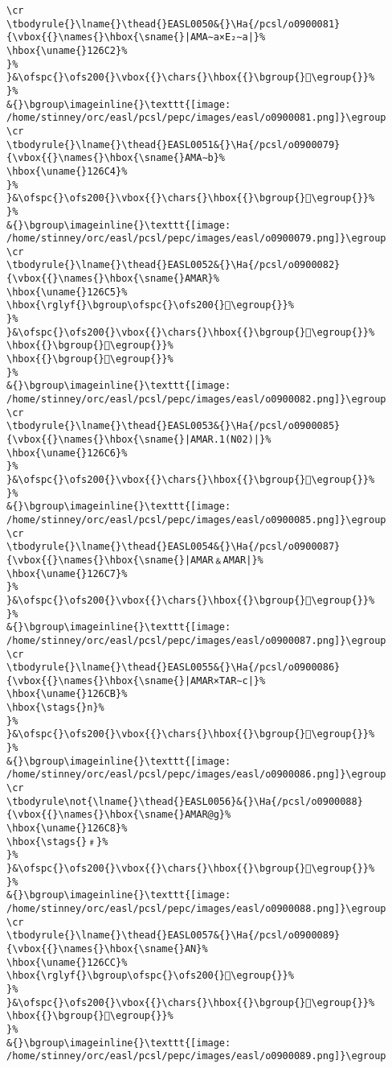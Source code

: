 \begin{verbatim}
\cr
\tbodyrule{}\lname{}\thead{}EASL0050&{}\Ha{/pcsl/o0900081}{\vbox{{}\names{}\hbox{\sname{}|AMA∼a×E₂∼a|}%
\hbox{\uname{}126C2}%
}%
}&\ofspc{}\ofs200{}\vbox{{}\chars{}\hbox{{}\bgroup{}𒛂\egroup{}}%
}%
&{}\bgroup\imageinline{}\texttt{[image: /home/stinney/orc/easl/pcsl/pepc/images/easl/o0900081.png]}\egroup
\cr
\tbodyrule{}\lname{}\thead{}EASL0051&{}\Ha{/pcsl/o0900079}{\vbox{{}\names{}\hbox{\sname{}AMA∼b}%
\hbox{\uname{}126C4}%
}%
}&\ofspc{}\ofs200{}\vbox{{}\chars{}\hbox{{}\bgroup{}𒛄\egroup{}}%
}%
&{}\bgroup\imageinline{}\texttt{[image: /home/stinney/orc/easl/pcsl/pepc/images/easl/o0900079.png]}\egroup
\cr
\tbodyrule{}\lname{}\thead{}EASL0052&{}\Ha{/pcsl/o0900082}{\vbox{{}\names{}\hbox{\sname{}AMAR}%
\hbox{\uname{}126C5}%
\hbox{\rglyf{}\bgroup\ofspc{}\ofs200{}𒛅\egroup{}}%
}%
}&\ofspc{}\ofs200{}\vbox{{}\chars{}\hbox{{}\bgroup{}𒛊\egroup{}}%
\hbox{{}\bgroup{}𒛅\egroup{}}%
\hbox{{}\bgroup{}𒛉\egroup{}}%
}%
&{}\bgroup\imageinline{}\texttt{[image: /home/stinney/orc/easl/pcsl/pepc/images/easl/o0900082.png]}\egroup
\cr
\tbodyrule{}\lname{}\thead{}EASL0053&{}\Ha{/pcsl/o0900085}{\vbox{{}\names{}\hbox{\sname{}|AMAR.1(N02)|}%
\hbox{\uname{}126C6}%
}%
}&\ofspc{}\ofs200{}\vbox{{}\chars{}\hbox{{}\bgroup{}𒛆\egroup{}}%
}%
&{}\bgroup\imageinline{}\texttt{[image: /home/stinney/orc/easl/pcsl/pepc/images/easl/o0900085.png]}\egroup
\cr
\tbodyrule{}\lname{}\thead{}EASL0054&{}\Ha{/pcsl/o0900087}{\vbox{{}\names{}\hbox{\sname{}|AMAR﹠AMAR|}%
\hbox{\uname{}126C7}%
}%
}&\ofspc{}\ofs200{}\vbox{{}\chars{}\hbox{{}\bgroup{}𒛇\egroup{}}%
}%
&{}\bgroup\imageinline{}\texttt{[image: /home/stinney/orc/easl/pcsl/pepc/images/easl/o0900087.png]}\egroup
\cr
\tbodyrule{}\lname{}\thead{}EASL0055&{}\Ha{/pcsl/o0900086}{\vbox{{}\names{}\hbox{\sname{}|AMAR×TAR∼c|}%
\hbox{\uname{}126CB}%
\hbox{\stags{}n}%
}%
}&\ofspc{}\ofs200{}\vbox{{}\chars{}\hbox{{}\bgroup{}𒛋\egroup{}}%
}%
&{}\bgroup\imageinline{}\texttt{[image: /home/stinney/orc/easl/pcsl/pepc/images/easl/o0900086.png]}\egroup
\cr
\tbodyrule\not{\lname{}\thead{}EASL0056}&{}\Ha{/pcsl/o0900088}{\vbox{{}\names{}\hbox{\sname{}AMAR@g}%
\hbox{\uname{}126C8}%
\hbox{\stags{}﹟}%
}%
}&\ofspc{}\ofs200{}\vbox{{}\chars{}\hbox{{}\bgroup{}𒛈\egroup{}}%
}%
&{}\bgroup\imageinline{}\texttt{[image: /home/stinney/orc/easl/pcsl/pepc/images/easl/o0900088.png]}\egroup
\cr
\tbodyrule{}\lname{}\thead{}EASL0057&{}\Ha{/pcsl/o0900089}{\vbox{{}\names{}\hbox{\sname{}AN}%
\hbox{\uname{}126CC}%
\hbox{\rglyf{}\bgroup\ofspc{}\ofs200{}𒛌\egroup{}}%
}%
}&\ofspc{}\ofs200{}\vbox{{}\chars{}\hbox{{}\bgroup{}𒛍\egroup{}}%
\hbox{{}\bgroup{}𒛌\egroup{}}%
}%
&{}\bgroup\imageinline{}\texttt{[image: /home/stinney/orc/easl/pcsl/pepc/images/easl/o0900089.png]}\egroup

\end{verbatim}
